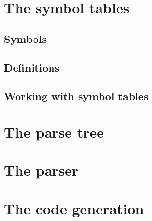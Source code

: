 \documentclass{report}
\begin{document}
\chapter{The symbol tables}

\section{Symbols}

\section{Definitions}

\section{Working with symbol tables}

\chapter{The parse tree}

\chapter{The parser}

\chapter{The code generation}
\end{document}
